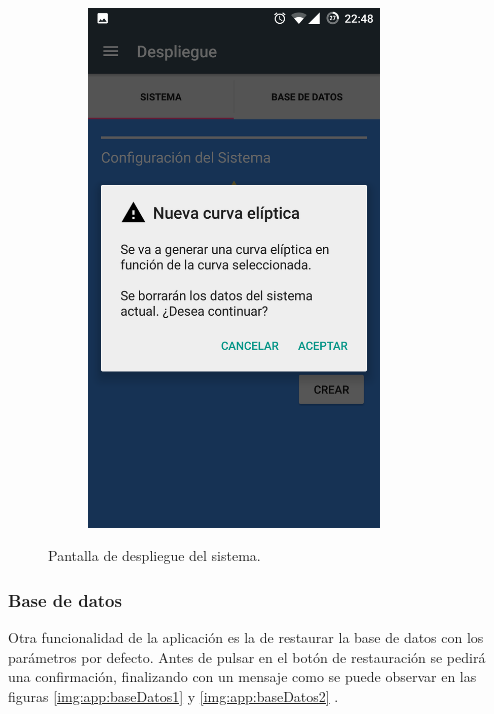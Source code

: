 \documentclass[../PFC.tex]{subfiles}
\begin{document}
\begin{figure}[H]
\begin{subfigure}{0.4\textwidth}
       \includegraphics[width=0.85\textwidth]{./img/app/despligueSistemaDialog}
    \end{subfigure}   
  \caption{Pantalla de despliegue del sistema.}
  \label{img:app:sistema}
\end{figure}

\subsubsection*{Base de datos}
\label{App:AD:D:Base de dtaos}

Otra funcionalidad de la aplicación es la de restaurar la base de datos con los parámetros por defecto. Antes de pulsar en el botón de restauración se pedirá una confirmación, finalizando con un mensaje como se puede observar en las figuras \ref{img:app:baseDatos1} y \ref{img:app:baseDatos2} .
\end{document}
